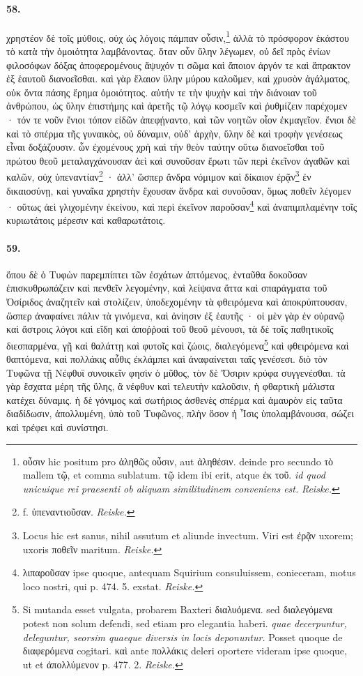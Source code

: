 \documentclass[a4paper, 11pt, oneside, polutonikogreek, german, landscape]{article}
\begin{document}
\paragraph{58.}
χρηστέον δὲ τοῖς μύθοις, οὐχ ὡς λόγοις πάμπαν οὖσιν,\footnote{οὖσιν hic positum pro ἀληθῶς οὖσιν, aut ἀληθέσιν. deinde pro secundo τὸ mallem τῷ, et comma sublatum. τῷ idem ibi erit, atque ἐκ τοῦ. \emph{id quod unicuique rei praesenti ob aliquam similitudinem conveniens est.} \emph{Reiske.}} ἀλλὰ τὸ πρόσφορον ἑκάστου τὸ κατὰ τὴν ὁμοιότητα λαμβάνοντας. ὅταν οὖν ὕλην λέγωμεν, οὐ δεῖ πρὸς ἐνίων φιλοσόφων δόξας ἀποφερομένους ἄψυχόν τι σῶμα καὶ ἄποιον ἀργόν τε καὶ ἄπρακτον ἐξ ἑαυτοῦ διανοεῖσθαι. καὶ γὰρ ἔλαιον ὕλην μύρου καλοῦμεν, καὶ χρυσὸν ἀγάλματος, οὐκ ὄντα πάσης ἔρημα ὁμοιότητος. αὐτήν τε τὴν ψυχὴν καὶ τὴν διάνοιαν τοῦ ἀνθρώπου, ὡς ὕλην ἐπιστήμης καὶ ἀρετῆς τῷ λόγῳ κοσμεῖν καὶ ῥυθμίζειν παρέχομεν · τόν τε νοῦν ἔνιοι τόπον εἰδῶν ἀπεφῄναντο, καὶ τῶν νοητῶν οἷον ἐκμαγεῖον. ἔνιοι δὲ καὶ τὸ σπέρμα τῆς γυναικὸς, οὐ δύναμιν, οὐδ' ἀρχὴν, ὕλην δὲ καὶ τροφὴν γενέσεως εἶναι δοξάζουσιν. ὧν ἐχομένους χρὴ καὶ τὴν θεὸν ταύτην οὕτω διανοεῖσθαι τοῦ πρώτου θεοῦ μεταλαγχάνουσαν ἀεὶ καὶ συνοῦσαν ἔρωτι τῶν περὶ ἐκεῖνον ἀγαθῶν καὶ καλῶν, οὐχ ὑπεναντίαν\footnote{f. ὑπεναντιοῦσαν. \emph{Reiske.}} · ἀλλ' ὥσπερ ἄνδρα νόμιμον καὶ δίκαιον ἐρᾷν\footnote{Locus hic est sanus, nihil assutum et aliunde invectum. Viri est ἐρᾷν uxorem; uxoris ποθεῖν maritum. \emph{Reiske.}} ἐν δικαιοσύνῃ, καὶ γυναῖκα χρηστὴν ἔχουσαν ἄνδρα καὶ συνοῦσαν, ὅμως ποθεῖν λέγομεν · οὕτως ἀεὶ γλιχομένην ἐκείνου, καὶ περὶ ἐκεῖνον παροῦσαν\footnote{λιπαροῦσαν ipse quoque, antequam Squirium consuluissem, conieceram, motus loco nostri, qui p. 474. 5. exstat. \emph{Reiske.}} καὶ ἀναπιμπλαμένην τοῖς κυριωτάτοις μέρεσιν καὶ καθαρωτάτοις.

\paragraph{59.}
ὅπου δὲ ὁ Τυφὼν παρεμπίπτει τῶν ἐσχάτων ἁπτόμενος, ἐνταῦθα δοκοῦσαν ἐπισκυθρωπάζειν καὶ πενθεῖν λεγομένην, καὶ λείψανα ἄττα καὶ σπαράγματα τοῦ Ὀσίριδος ἀναζητεῖν καὶ στολίζειν, ὑποδεχομένην τὰ φθειρόμενα καὶ ἀποκρύπτουσαν, ὥσπερ ἀναφαίνει πάλιν τὰ γινόμενα, καὶ ἀνίησιν ἐξ ἑαυτῆς · οἱ μὲν γὰρ ἐν οὐρανῷ καὶ ἄστροις λόγοι καὶ εἴδη καὶ ἀποῤῥοαὶ τοῦ θεοῦ μένουσι, τὰ δὲ τοῖς παθητικοῖς διεσπαρμένα, γῇ καὶ θαλάττῃ καὶ φυτοῖς καὶ ζώοις, διαλεγόμενα\footnote{Si mutanda esset vulgata, probarem Baxteri διαλυόμενα. sed διαλεγόμενα potest non solum defendi, sed etiam pro elegantia haberi. \emph{quae decerpuntur, deleguntur, seorsim quaeque diversis in locis deponuntur.} Posset quoque de διαφερόμενα cogitari. καὶ ante πολλάκις deleri oportere videram ipse quoque, ut et ἀπολλύμενον p. 477. 2. \emph{Reiske.}} καὶ φθειρόμενα καὶ θαπτόμενα, καὶ πολλάκις αὖθις ἐκλάμπει καὶ ἀναφαίνεται ταῖς γενέσεσι. διὸ τὸν Τυφῶνα τῇ Νέφθυϊ συνοικεῖν φησὶν ὁ μῦθος, τὸν δὲ Ὄσιριν κρύφα συγγενέσθαι. τὰ γὰρ ἔσχατα μέρη τῆς ὕλης, ἃ νέφθυν καὶ τελευτὴν καλοῦσιν, ἡ φθαρτικὴ μάλιστα κατέχει δύναμις. ἡ δὲ γόνιμος καὶ σωτήριος ἀσθενὲς σπέρμα καὶ ἀμαυρὸν εἰς ταῦτα διαδίδωσιν, ἀπολλυμένη, ὑπὸ τοῦ Τυφῶνος, πλὴν ὅσον ἡ Ἶσις ὑπολαμβάνουσα, σώζει καὶ τρέφει καὶ συνίστησι.
\end{document}
